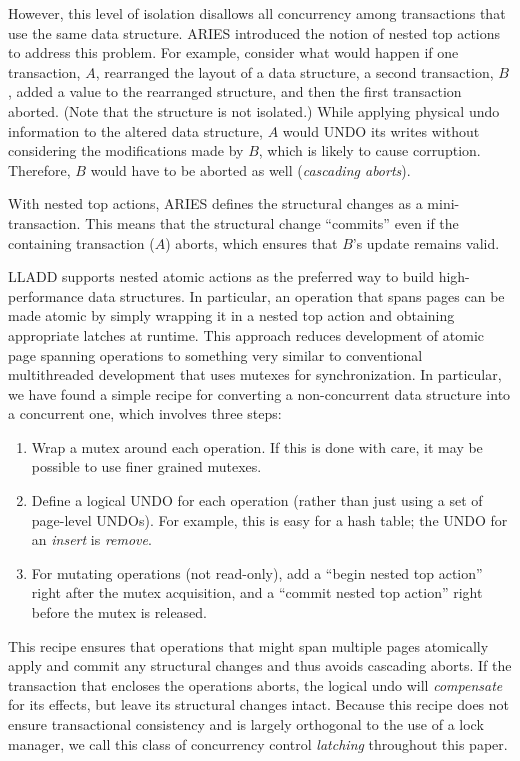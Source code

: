 \documentclass[10pt,letterpaper,twocolumn,english]{article}
\newcommand{\yad}{LLADD\xspace}
\begin{document}
However, this level of isolation disallows all concurrency among 
transactions that use the same data structure.  ARIES introduced the 
notion of nested top actions to
address this problem.  For example, consider what would happen if one
transaction, $A$, rearranged the layout of a data structure, a second
transaction, $B$, added a value to the rearranged structure, and then
the first transaction aborted.  (Note that the structure is not
isolated.)  While applying physical undo information to the altered
data structure,  $A$ would UNDO its writes
without considering the modifications made by
$B$, which is likely to cause corruption.  Therefore, $B$ would 
have to be aborted as well ({\em cascading aborts}).

With nested top actions, ARIES defines the structural changes as a
mini-transaction. This means that the structural change
``commits'' even if the containing transaction ($A$) aborts, which
ensures that $B$'s update remains valid.

\yad supports nested atomic actions as the preferred way to build
high-performance data structures. In particular, an operation that
spans pages can be made atomic by simply wrapping it in a nested top
action and obtaining appropriate latches at runtime.  This approach
reduces development of atomic page spanning operations to something
very similar to conventional multithreaded development that uses mutexes
for synchronization.
In particular, we have found a simple recipe for converting a
non-concurrent data structure into a concurrent one, which involves
three steps:
\begin{enumerate}
\item Wrap a mutex around each operation.  If this is done with care,
  it may be possible to use finer grained mutexes.
\item Define a logical UNDO for each operation (rather than just using
  a set of page-level UNDOs).  For example, this is easy for a
  hash table; the UNDO for an {\em insert} is {\em remove}.
\item For mutating operations (not read-only), add a ``begin nested
  top action'' right after the mutex acquisition, and a ``commit
  nested top action'' right before the mutex is released.
\end{enumerate}
This recipe ensures that operations that might span multiple pages
atomically apply and commit any structural changes and thus avoids 
cascading aborts.  If the transaction that encloses the operations
aborts, the logical undo will {\em compensate} for
its effects, but leave its structural changes intact. Because this 
recipe does not ensure transactional consistency and is largely 
orthogonal to the use of a lock manager, we call this class of 
concurrency control {\em latching} throughout this paper.
\end{document}
